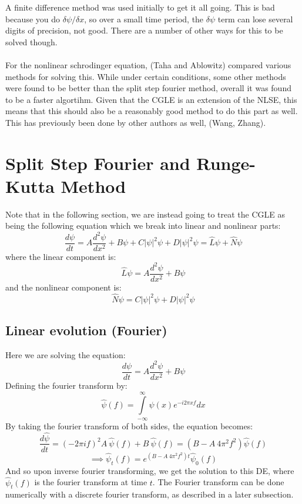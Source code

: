 \documentclass[a4paper,12pt]{report}
\begin{document}
A finite difference method was used initially to get it all going. This is bad because you do $\delta \psi / \delta x$, so over a small time period, the $\delta \psi$ term can lose several digits of precision, not good. There are a number of other ways for this to be solved though. 
\\\\ 
For the nonlinear schrodinger equation, (Taha and Ablowitz) compared various methods for solving this. While under certain conditions, some other methods were found to be better than the split step fourier method, overall it was found to be a faster algortihm. Given that the CGLE is an extension of the NLSE, this means that this should also be a reasonably good method to do this part as well. This has previously been done by other authors as well, (Wang, Zhang).

\section{Split Step Fourier and Runge-Kutta Method}
Note that in the following section, we are instead going to treat the CGLE as being the following equation which we break into linear and nonlinear parts:
$$\frac{d\psi}{dt} = A \frac{d^2\psi}{dx^2} + B\psi + C |\psi|^2\psi + D|\psi|^2\psi = \hat L \psi + \hat N \psi$$
where the linear component is:
$$\hat L \psi = A \frac{d^2\psi}{dx^2} + B\psi$$
and the nonlinear component is:
$$\hat N \psi = C |\psi|^2\psi + D|\psi|^2\psi$$

\subsection{Linear evolution (Fourier)}
Here we are solving the equation: 
$$\frac{d\psi}{dt}=A\frac{d^2\psi}{dx^2}+B\psi$$
Defining the fourier transform by: 
$$\hat \psi(f)=\int\limits_{-\infty}^\infty \psi(x)e^{-i2\pi x f} dx$$
By taking the fourier transform of both sides, the equation becomes:\\
$$\frac{d \hat \psi}{dt}= (-2\pi i f)^2 A \ \hat \psi (f)+B\ \hat \psi(f)= (B-A \ 4 \pi^2 f^2) \hat \psi(f)$$
$$\implies \hat \psi_t(f) = e^{(B-A \ 4\pi^2 f^2)t}\hat \psi_0(f)$$
And so upon inverse fourier transforming, we get the solution to this DE, where $\hat \psi_t(f)$ is the fourier transform at time $t$.
The Fourier transform can be done numerically with a discrete fourier transform, as described in a later subsection.
\end{document}

